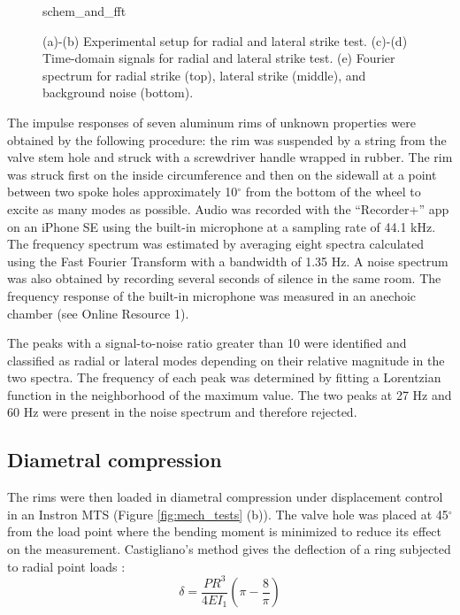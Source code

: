 \documentclass[../thesis.tex]{subfiles}
\begin{document}
\begin{figure}
\centering
{schem_and_fft}
\caption{(a)-(b) Experimental setup for radial and lateral strike test. (c)-(d) Time-domain signals for radial and lateral strike test. (e) Fourier spectrum for radial strike (top), lateral strike (middle), and background noise (bottom).}
\label{fig:schem}
\end{figure}

The impulse responses of seven aluminum rims of unknown properties were obtained by the following procedure: the rim was suspended by a string from the valve stem hole and struck with a screwdriver handle wrapped in rubber. The rim was struck first on the inside circumference and then on the sidewall at a point between two spoke holes approximately 10$^{\circ}$ from the bottom of the wheel to excite as many modes as possible. Audio was recorded with the ``Recorder+'' app on an iPhone SE using the built-in microphone at a sampling rate of 44.1 kHz. The frequency spectrum was estimated by averaging eight spectra calculated using the Fast Fourier Transform with a bandwidth of 1.35 Hz. A noise spectrum was also obtained by recording several seconds of silence in the same room. The frequency response of the built-in microphone was measured in an anechoic chamber (see Online Resource 1).

The peaks with a signal-to-noise ratio greater than 10 were identified and classified as radial or lateral modes depending on their relative magnitude in the two spectra. The frequency of each peak was determined by fitting a Lorentzian function in the neighborhood of the maximum value. The two peaks at 27 Hz and 60 Hz were present in the noise spectrum and therefore rejected.

\subsection{Diametral compression}
The rims were then loaded in diametral compression under displacement control in an Instron MTS (Figure \ref{fig:mech_tests} (b)). The valve hole was placed at 45$^{\circ}$ from the load point where the bending moment is minimized to reduce its effect on the measurement. Castigliano's method gives the deflection of a ring subjected to radial point loads \cite{Timoshenko1961a}:
  \begin{equation}\label{eq:def_rad}
  \delta = \frac{PR^3}{4EI_1} \left(\pi-\frac{8}{\pi} \right)
  \end{equation}
\end{document}
